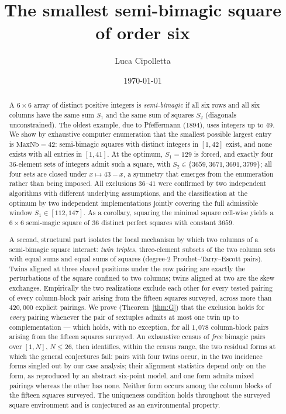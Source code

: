 \documentclass[11pt]{article}
\title{The smallest semi-bimagic square of order six}
\author{Luca Cipolletta}
\date{\today}
\begin{document}
\maketitle

\begin{abstract}
A $6\times 6$ array of distinct positive integers is \emph{semi-bimagic}
if all six rows and all six columns have the same sum $S_1$ and the same
sum of squares $S_2$ (diagonals unconstrained). The oldest example, due
to Pfeffermann (1894), uses integers up to $49$. We show by exhaustive
computer enumeration that the smallest possible largest entry is
$\mathrm{MaxNb}=42$: semi-bimagic squares with distinct integers in
$[1,42]$ exist, and none exists with all entries in $[1,41]$. At the
optimum, $S_1=129$ is forced, and exactly four $36$-element sets of
integers admit such a square, with $S_2\in\{3659,3671,3691,3799\}$; all
four sets are closed under $x\mapsto 43-x$, a symmetry that emerges from
the enumeration rather than being imposed. All exclusions $36$--$41$
were confirmed by two independent algorithms with different underlying
assumptions, and the classification at the optimum by two independent
implementations jointly covering the full admissible window
$S_1\in[112,147]$. As a corollary, squaring the minimal square cell-wise
yields a $6\times6$ semi-magic square of $36$ distinct perfect squares
with constant $3659$.

A second, structural part isolates the local mechanism by which two
columns of a semi-bimagic square interact: \emph{twin triples},
three-element subsets of the two column sets with equal sums and equal
sums of squares (degree-$2$ Prouhet--Tarry--Escott pairs). Twins
aligned at three shared positions under the row pairing are exactly
the perturbations of the square confined to two columns; twins aligned
at two are the skew exchanges. Empirically the two realizations
exclude each other for every tested pairing of every column-block
pair arising from the fifteen squares surveyed, across more than
$420{,}000$ explicit pairings. We prove (Theorem~\ref{thm:G}) that
the exclusion holds for \emph{every} pairing whenever the pair of
sextuples admits at most one twin up to complementation --- which
holds, with no exception, for all $1{,}078$ column-block pairs
arising from the fifteen squares surveyed. An exhaustive census of
\emph{free} bimagic pairs over $[1,N]$, $N\le26$, then identifies,
within the census range, the two residual forms at which the general
conjectures fail: pairs with four twins occur, in the two incidence
forms singled out by our case analysis; their alignment statistics
depend only on the form, as reproduced by an abstract six-point
model, and one form admits mixed pairings whereas the other has
none. Neither form occurs among the column blocks of the fifteen
squares surveyed. The uniqueness condition holds throughout the
surveyed square environment and is conjectured as an environmental
property.
\end{abstract}
\end{document}
